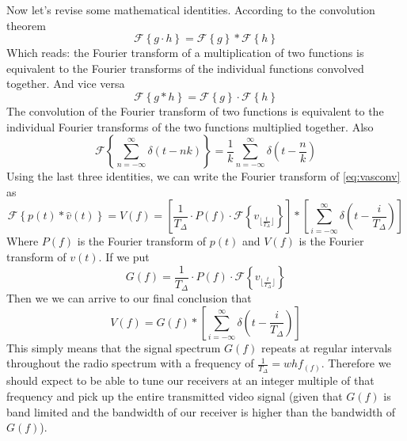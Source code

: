\documentclass[a4paper,12pt,twoside,openright]{report}
\begin{document}
Now let's revise some mathematical identities. According to the convolution theorem
\begin{equation}
\mathcal{F} \left\{ g \cdot h \right\} = \mathcal{F} \left\{ g \right\} \ast  \mathcal{F} \left\{ h \right\}
\end{equation}
Which reads: the Fourier transform of a multiplication of two functions is equivalent to the Fourier transforms of the individual functions convolved together. And vice versa
\begin{equation}
\mathcal{F} \left\{ g \ast h \right\} = \mathcal{F} \left\{ g \right\} \cdot  \mathcal{F} \left\{ h \right\}
\end{equation}
The convolution of the Fourier transform of two functions is equivalent to the individual Fourier transforms of the two functions multiplied together.
Also
\begin{equation}
\mathcal{F} \left\{ \sum\limits_{n=-\infty}^{\infty}  \delta(t-n k) \right\} = \frac{1}{k} \sum\limits_{n=-\infty}^{\infty}  \delta \left( t-\frac{n}{k} \right)
\end{equation}
Using the last three identities, we can write the Fourier transform of \ref{eq:vasconv} as
\begin{equation} 
\mathcal{F} \left\{ p(t) \ast \hat{v}(t) \right\} = V(f) =
\left[ \frac{1}{T_{\Delta}} \cdot P(f) \cdot \mathcal{F} \left\{ v_{ \lfloor \frac{t}{T_{\Delta}} \rfloor } \right\} \right] \ast
\left[ \sum\limits_{i=-\infty}^{\infty}  \delta \left( t-\frac{i}{T_{\Delta}} \right) \right]
\end{equation}
Where $P(f)$ is the Fourier transform of $p(t)$ and $V(f)$ is the Fourier transform of $v(t)$. If we put 
\begin{equation} 
G(f) = \frac{1}{T_{\Delta}} \cdot P(f) \cdot \mathcal{F} \left\{ v_{ \lfloor \frac{t}{T_{\Delta}} \rfloor } \right\}
\end{equation}
Then we we can arrive to our final conclusion that
\begin{equation}
V(f) = G(f) \ast
\left[ \sum\limits_{i=-\infty}^{\infty}  \delta \left( t-\frac{i}{T_{\Delta}} \right) \right]
\end{equation}
This simply means that the signal spectrum $G(f)$ repeats at regular intervals throughout the radio spectrum with a frequency of $\frac{1}{T_{\Delta}} = w h f_(f)$. Therefore we should expect to be able to tune our receivers at an integer multiple of that frequency and pick up the entire transmitted video signal (given that $G(f)$ is band limited and the bandwidth of our receiver is higher than the bandwidth of $G(f)$).
\end{document}
